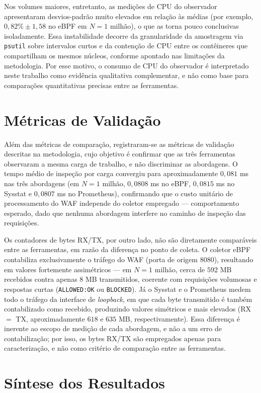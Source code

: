 Nos volumes maiores, entretanto, as medições de CPU do observador apresentaram desvios-padrão muito elevados em relação às médias (por exemplo, $0{,}82\% \pm 1{,}58$ no eBPF em $N = 1$ milhão), o que as torna pouco conclusivas isoladamente. Essa instabilidade decorre da granularidade da amostragem via \texttt{psutil} sobre intervalos curtos e da contenção de CPU entre os contêineres que compartilham os mesmos núcleos, conforme apontado nas limitações da metodologia. Por esse motivo, o consumo de CPU do observador é interpretado neste trabalho como evidência qualitativa complementar, e não como base para comparações quantitativas precisas entre as ferramentas.

\section{Métricas de Validação}

Além das métricas de comparação, registraram-se as métricas de validação descritas na metodologia, cujo objetivo é confirmar que as três ferramentas observaram a mesma carga de trabalho, e não discriminar as abordagens. O tempo médio de inspeção por carga convergiu para aproximadamente $0{,}081$ ms nas três abordagens (em $N = 1$ milhão, $0{,}0808$ ms no eBPF, $0{,}0815$ ms no Sysstat e $0{,}0807$ ms no Prometheus), confirmando que o custo unitário de processamento do WAF independe do coletor empregado --- comportamento esperado, dado que nenhuma abordagem interfere no caminho de inspeção das requisições.

Os contadores de bytes RX/TX, por outro lado, não são diretamente comparáveis entre as ferramentas, em razão da diferença no ponto de coleta. O coletor eBPF contabiliza exclusivamente o tráfego do WAF (porta de origem 8080), resultando em valores fortemente assimétricos --- em $N = 1$ milhão, cerca de $592$ MB recebidos contra apenas $8$ MB transmitidos, coerente com requisições volumosas e respostas curtas (\texttt{ALLOWED:OK} ou \texttt{BLOCKED}). Já o Sysstat e o Prometheus medem todo o tráfego da interface de \textit{loopback}, em que cada byte transmitido é também contabilizado como recebido, produzindo valores simétricos e mais elevados (RX $=$ TX, aproximadamente $618$ e $635$ MB, respectivamente). Essa diferença é inerente ao escopo de medição de cada abordagem, e não a um erro de contabilização; por isso, os bytes RX/TX são empregados apenas para caracterização, e não como critério de comparação entre as ferramentas.

\section{Síntese dos Resultados}

